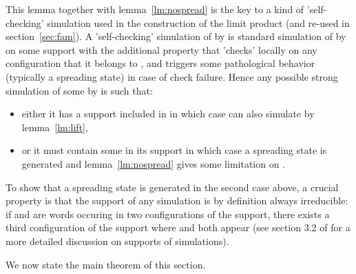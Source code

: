 \documentclass[a4paper]{elsarticle}
\begin{document}
This lemma together with lemma~\ref{lm:nospread} is the key to a kind
of 'self-checking' simulation used in the construction of the limit
product (and re-used in section~\ref{sec:fam}). A 'self-checking'
simulation of  by  is standard simulation of  by
 on some support  with the additional property that 
'checks' locally on any configuration that it belongs to , and
triggers some pathological behavior (typically a spreading state) in
case of check failure.  Hence any possible strong simulation of some
 by  is such that:
\begin{itemize}
\item either it has a support included in  in which case  can
  also simulate  by lemma~\ref{lm:lift},
\item or it must contain some  in its support in which
  case a spreading state is generated and lemma~\ref{lm:nospread}
  gives some limitation on .
\end{itemize}

To show that a spreading state is generated in the second case above,
a crucial property is that the support of any simulation is by
definition always irreducible: if  and  are words occuring
in two configurations of the support, there exists a third
configuration of the support where  and  both appear (see
section 3.2 of \cite{bulking1} for a more detailed discussion on
supports of simulations).

We now state the main theorem of this section.
\end{document}
